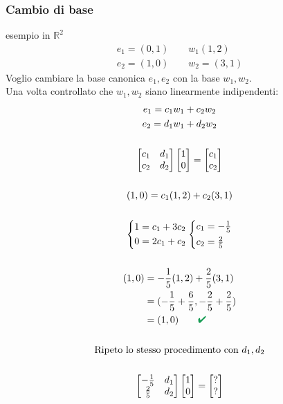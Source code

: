 \documentclass[italian]{article}
\renewcommand{\checkmark}{\textcolor{ForestGreen}{\text{$\qquad$\ding{52}}}}
\newcommand{\ins}[1]{\text{$\mathbb{#1}$}}
\begin{document}
\subsubsection{Cambio di base} esempio in $\ins{R}^2$
\begin{gather*}
	e_1 = (0,1) \qquad w_1(1,2) \\
	e_2 = (1,0) \qquad w_2 = (3,1)
\end{gather*}
Voglio cambiare la base canonica $e_1,e_2$ con la base $w_1,w_2$.\\
Una volta controllato che $w_1,w_2$ siano linearmente indipendenti:
\begin{gather*}
	e_1 = c_1w_1 + c_2w_2 \\
	e_2 = d_1w_1 + d_2w_2 \\\\
	\begin{bmatrix}
		c_1 & d_1 \\
		c_2 & d_2
	\end{bmatrix}
	\begin{bmatrix}
		1 \\ 0
	\end{bmatrix}
	=
	\begin{bmatrix}
		c_1 \\ c_2
	\end{bmatrix} \\\\
	(1,0) = c_1(1,2) + c_2(3,1) \\\\
	\begin{cases*}
		1 = c_1 + 3c_2 \\
		0 = 2c_1 + c_2
	\end{cases*}
	\begin{cases*}
		c_1 = -\frac{1}{5} \\
		c_2 = \frac{2}{5}
	\end{cases*} \\\\
	\begin{split}
		(1,0) &= -\frac{1}{5}(1,2) + \dfrac{2}{5}(3,1) \\
		&= (-\frac{1}{5} + \frac{6}{5}, -\frac{2}{5} + \frac{2}{5}) \\
		&= (1,0) \checkmark
	\end{split} \\\\
	\text{Ripeto lo stesso procedimento con } d_1, d_2 \\\\
	\begin{bmatrix}
		-\frac{1}{5} & d_1 \\
		\frac{2}{5} & d_2
	\end{bmatrix}
	\begin{bmatrix}
		1 \\ 0
	\end{bmatrix}
	=
	\begin{bmatrix}
		? \\ ?
	\end{bmatrix}
\end{gather*}
\end{document}
